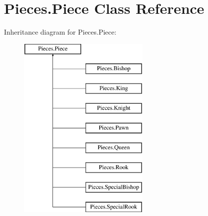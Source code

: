 \hypertarget{classPieces_1_1Piece}{\section{Pieces.\-Piece Class Reference}
\label{classPieces_1_1Piece}
}
Inheritance diagram for Pieces.\-Piece\-:\begin{figure}[H]
\begin{center}
\leavevmode
\includegraphics[height=9.000000cm]{classPieces_1_1Piece}
\end{center}
\end{figure}
